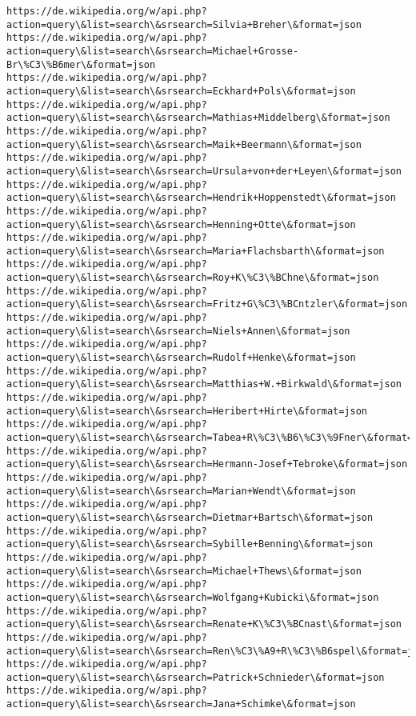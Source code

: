 \documentclass[11pt]{article}
\begin{document}
\begin{Verbatim}[commandchars=\\\{\}]
https://de.wikipedia.org/w/api.php?action=query\&list=search\&srsearch=Silvia+Breher\&format=json
https://de.wikipedia.org/w/api.php?action=query\&list=search\&srsearch=Michael+Grosse-Br\%C3\%B6mer\&format=json
https://de.wikipedia.org/w/api.php?action=query\&list=search\&srsearch=Eckhard+Pols\&format=json
https://de.wikipedia.org/w/api.php?action=query\&list=search\&srsearch=Mathias+Middelberg\&format=json
https://de.wikipedia.org/w/api.php?action=query\&list=search\&srsearch=Maik+Beermann\&format=json
https://de.wikipedia.org/w/api.php?action=query\&list=search\&srsearch=Ursula+von+der+Leyen\&format=json
https://de.wikipedia.org/w/api.php?action=query\&list=search\&srsearch=Hendrik+Hoppenstedt\&format=json
https://de.wikipedia.org/w/api.php?action=query\&list=search\&srsearch=Henning+Otte\&format=json
https://de.wikipedia.org/w/api.php?action=query\&list=search\&srsearch=Maria+Flachsbarth\&format=json
https://de.wikipedia.org/w/api.php?action=query\&list=search\&srsearch=Roy+K\%C3\%BChne\&format=json
https://de.wikipedia.org/w/api.php?action=query\&list=search\&srsearch=Fritz+G\%C3\%BCntzler\&format=json
https://de.wikipedia.org/w/api.php?action=query\&list=search\&srsearch=Niels+Annen\&format=json
https://de.wikipedia.org/w/api.php?action=query\&list=search\&srsearch=Rudolf+Henke\&format=json
https://de.wikipedia.org/w/api.php?action=query\&list=search\&srsearch=Matthias+W.+Birkwald\&format=json
https://de.wikipedia.org/w/api.php?action=query\&list=search\&srsearch=Heribert+Hirte\&format=json
https://de.wikipedia.org/w/api.php?action=query\&list=search\&srsearch=Tabea+R\%C3\%B6\%C3\%9Fner\&format=json
https://de.wikipedia.org/w/api.php?action=query\&list=search\&srsearch=Hermann-Josef+Tebroke\&format=json
https://de.wikipedia.org/w/api.php?action=query\&list=search\&srsearch=Marian+Wendt\&format=json
https://de.wikipedia.org/w/api.php?action=query\&list=search\&srsearch=Dietmar+Bartsch\&format=json
https://de.wikipedia.org/w/api.php?action=query\&list=search\&srsearch=Sybille+Benning\&format=json
https://de.wikipedia.org/w/api.php?action=query\&list=search\&srsearch=Michael+Thews\&format=json
https://de.wikipedia.org/w/api.php?action=query\&list=search\&srsearch=Wolfgang+Kubicki\&format=json
https://de.wikipedia.org/w/api.php?action=query\&list=search\&srsearch=Renate+K\%C3\%BCnast\&format=json
https://de.wikipedia.org/w/api.php?action=query\&list=search\&srsearch=Ren\%C3\%A9+R\%C3\%B6spel\&format=json
https://de.wikipedia.org/w/api.php?action=query\&list=search\&srsearch=Patrick+Schnieder\&format=json
https://de.wikipedia.org/w/api.php?action=query\&list=search\&srsearch=Jana+Schimke\&format=json

\end{Verbatim}
\end{document}
